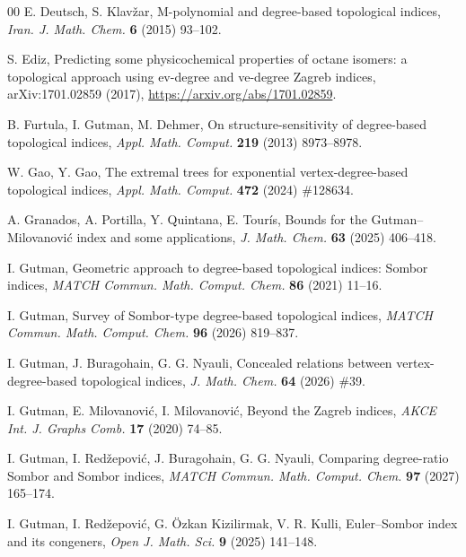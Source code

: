 \documentclass[a5paper, 10pt]{article}
\theoremstyle{plain}
\theoremstyle{remark}
\theoremstyle{definition}
\begin{document}
\begin{thebibliography}{00}
   E. Deutsch, S. Klav\v{z}ar, M-polynomial and
  degree-based topological indices, \textit{Iran. J. Math. Chem.\/} \textbf{6}
  (2015) 93--102.

  S. Ediz, Predicting some physicochemical properties of octane isomers:
  a topological approach using ev-degree and ve-degree Zagreb indices,
  arXiv:1701.02859 (2017), \url{https://arxiv.org/abs/1701.02859}.

   B. Furtula, I. Gutman, M. Dehmer, On
  structure-sensitivity of degree-based topological indices, \textit{Appl.
  Math. Comput.\/} \textbf{219} (2013) 8973--8978.

   W. Gao, Y. Gao, The extremal trees for
  exponential vertex-degree-based topological indices, \textit{Appl.
  Math. Comput.\/} \textbf{472} (2024) \#128634.

   A. Granados, A. Portilla, Y. Quintana,
  E. Tour\'is, Bounds for the Gutman--Milovanovi\'c index and some
  applications, \textit{J. Math. Chem.\/} \textbf{63} (2025)
  406--418.

   I. Gutman, Geometric approach to degree-based
  topological indices: Sombor indices, \textit{MATCH Commun. Math. Comput.
  Chem.\/} \textbf{86} (2021) 11--16.

   I. Gutman, Survey of Sombor-type
  degree-based topological indices, \textit{MATCH Commun. Math. Comput.
  Chem.\/} \textbf{96} (2026) 819--837.

   I. Gutman, J. Buragohain,
  G. G. Nyauli, Concealed relations between vertex-degree-based
  topological indices, \textit{J. Math. Chem.\/} \textbf{64} (2026) \#39.

   I. Gutman, E. Milovanovi\'c,
  I. Milovanovi\'c, Beyond the Zagreb indices, \textit{AKCE Int. J.
  Graphs Comb.\/} \textbf{17} (2020) 74--85.

   I. Gutman, I. Red\v{z}epovi\'c,
  J. Buragohain, G. G. Nyauli, Comparing degree-ratio Sombor and Sombor indices,
  \textit{MATCH Commun. Math. Comput. Chem.\/} \textbf{97} (2027) 165--174.

   I. Gutman, I. Red\v{z}epovi\'c,
  G. \"Ozkan Kizilirmak, V. R. Kulli, Euler--Sombor index and its congeners,
  \textit{Open J. Math. Sci.\/} \textbf{9} (2025) 141--148.


\end{thebibliography}
\end{document}
